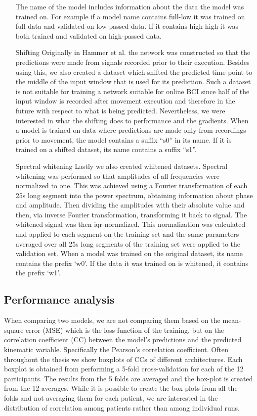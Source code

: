 \begin{itemize}
The name of the model includes information about the data the model was trained on. For example if a model name contains full-low it was trained on full data and validated on low-passed data. If it contains high-high it was both trained and validated on high-passed data.
\item[Shifting] Originally in Hammer et al. the network was constructed so that the predictions were made from signals recorded prior to their execution. Besides using this, we also created a dataset which shifted the predicted time-point to the middle of the input window that is used for its prediction. Such a dataset is not suitable for training a network suitable for online BCI since half of the input window is recorded after movement execution and therefore in the future with respect to what is being predicted. Nevertheless, we were interested in what the shifting does to performance and the gradients.
	When a model is trained on data where predictions are made only from recordings prior to movement, the model contains a suffix “s0” in its name. If it is trained on a shifted dataset, its name contains a suffix “s1”.
\item[Spectral whitening]  Lastly we also created whitened datasets. Spectral whitening was performed so that amplitudes of all frequencies were normalized to one. This was achieved using a Fourier transformation of each 25s long segment into the power spectrum, obtaining information about phase and amplitude. Then dividing the amplitudes with their absolute value and then, via inverse Fourier transformation, transforming it back to signal. The whitened signal was then iqr-normalized. This normalization was calculated and applied to each segment on the training set and the same parameters averaged over all 25s long segments of the training set were applied to the validation set.
	When a model was trained on the original dataset, its name contains the prefix ‘w0’. If the data it was trained on is whitened, it contains the prefix ‘w1’.
\end{itemize}

\subsection{Performance analysis}
When comparing two models, we are not comparing them based on the mean-square error (MSE) which is the loss function of the training, but on the correlation coefficient (CC) between the model’s predictions and the predicted kinematic variable.
Specifically the Pearson’s correlation coefficient. Often throughout the thesis we show boxplots of CCs of different architectures.
Each boxplot is obtained from performing a 5-fold cross-validation for each of the 12 participants.
The results from the 5 folds are averaged and the box-plot is created from the 12 averages.
While it is possible to create the box-plots from all the folds and not averaging them for each patient, we are interested in the distribution of correlation among patients rather than among individual runs.